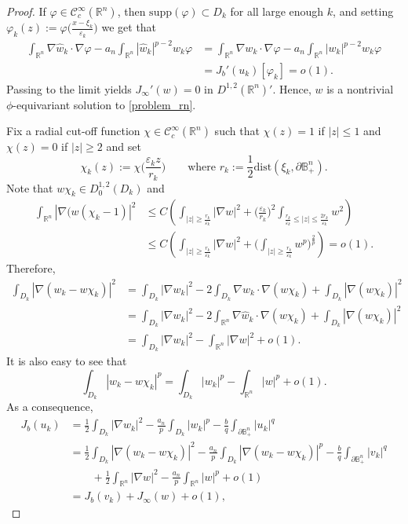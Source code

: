 \documentclass[reqno,11pt,oneside]{amsart}
\numberwithin{equation}{section}
\def\D{\mathbb{B}^n_+}
\def\rn{\mathbb{R}^n}
\def\eps{\varepsilon}
\def\irn{\int_{\rn}}
\def\vp{\varphi}
\def\cC{\mathcal{C}}
\def\supp{\mathrm{supp}}
\def\what{\widehat}
\def\dist{\mathrm{dist}}
\begin{document}
\begin{proof}
If $\vp\in\cC^\infty_c(\rn)$, then $\supp(\vp)\subset D_k$ for all large enough $k$, and setting $\vp_k(z):=\vp\big(\frac{x-\xi_k}{\eps_k}\big)$ we get that
\begin{align*}
\irn\nabla\what w_k\cdot\nabla\vp-a_n\irn|\what w_k|^{p-2}w_k\vp &=\irn\nabla w_k\cdot\nabla\vp-a_n\irn|w_k|^{p-2}w_k\vp \\
& = J_b'(u_k)[\vp_k]=o(1).
\end{align*}
Passing to the limit yields $J_\infty'(w)=0$ in $D^{1,2}(\rn)'$. Hence, $w$ is a nontrivial $\phi$-equivariant solution to \eqref{problem_rn}. 

Fix a radial cut-off function $\chi\in\cC_c^\infty(\rn)$ such that $\chi(z)=1$ if $|z|\leq 1$ and $\chi(z)=0$ if $|z|\geq 2$ and set
$$\chi_k(z):=\chi\Big(\frac{\eps_k z}{r_k}\Big)\qquad\text{where \ }r_k:=\frac{1}{2}\dist(\xi_k,\partial\D).$$
Note that $w\chi_k\in D^{1,2}_0(D_k)$ and
\begin{align*}
\irn|\nabla(w(\chi_k-1)|^2 &\leq C\left(\int_{|z|\geq\frac{r_k}{\eps_k}}|\nabla w|^2 + \Big(\frac{\eps_k}{r_k}\Big)^2\int_{\frac{r_k}{\eps_k}\leq|z|\leq\frac{2r_k}{\eps_k}}w^2\right) \\
&\leq C\left(\int_{|z|\geq\frac{r_k}{\eps_k}}|\nabla w|^2 + \Big(\int_{|z|\geq\frac{r_k}{\eps_k}}w^p\Big)^\frac{2}{p}\right) = o(1).
\end{align*}
Therefore,
\begin{align*}
\int_{D_k}|\nabla(w_k-w\chi_k)|^2 &=\int_{D_k}|\nabla w_k|^2 - 2\int_{D_k}\nabla w_k\cdot\nabla(w\chi_k) + \int_{D_k}|\nabla(w\chi_k)|^2  \\
&=\int_{D_k}|\nabla w_k|^2 - 2\irn\nabla \what w_k\cdot\nabla(w\chi_k) + \int_{D_k}|\nabla(w\chi_k)|^2  \\
&=\int_{D_k}|\nabla w_k|^2 - \irn|\nabla w|^2 + o(1).
\end{align*}
It is also easy to see that
$$\int_{D_k}|w_k-w\chi_k|^p = \int_{D_k}|w_k|^p - \irn|w|^p + o(1).$$
As a consequence,
\begin{align}\label{eq:J(v)}
J_b(u_k)&=\frac{1}{2}\int_{D_k}|\nabla w_k|^2-\frac{a_n}{p}\int_{D_k}|w_k|^p - \frac{b}{q}\int_{\partial\D}|u_k|^q \nonumber \\
&=\frac{1}{2}\int_{D_k}|\nabla(w_k-w\chi_k)|^2-\frac{a_n}{p}\int_{D_k}|\nabla(w_k-w\chi_k)|^p - \frac{b}{q}\int_{\partial\D}|v_k|^q \nonumber\\
&\qquad+ \frac{1}{2}\irn|\nabla w|^2-\frac{a_n}{p}\irn|w|^p + o(1) \nonumber\\
&=J_b(v_k) + J_\infty(w) + o(1),
\end{align}

\end{proof}
\end{document}
